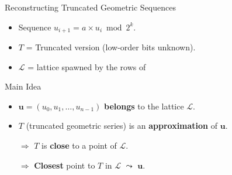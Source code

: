 \begin{frame}{Reconstructing Truncated Geometric Sequences}

\begin{itemize}
    \item Sequence $u_{i+1} = a \times u_i \bmod 2^k$.
    \item $T$ = Truncated version (low-order bits unknown).

\item \(\mathcal{L}\) = lattice spawned by the rows of
\begin{center}
\end{center}
\end{itemize}

\medskip

\begin{block}{Main Idea}
\begin{itemize}
\item $\mathbf{u} = (u_0, u_1, \dots, u_{n-1})$ \textbf{belongs} to the lattice $\mathcal{L}$.
\item $T$ (truncated geometric series) is an \textbf{approximation} of $\mathbf{u}$.
\item[$\Rightarrow$] $T$ is \textbf{close} to a point of $\mathcal{L}$.
\item[$\Rightarrow$] \textbf{Closest} point to $T$ in $\mathcal{L}$ $\leadsto$ $\mathbf{u}$.
\end{itemize}
\end{block}
\end{frame}

